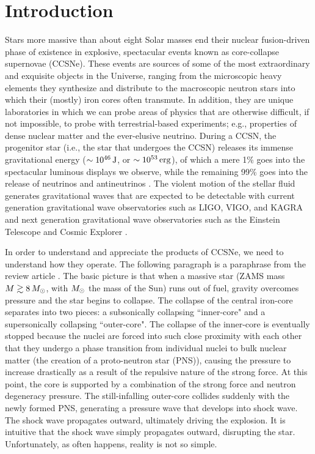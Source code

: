 \chapter{Introduction}

Stars more massive than about eight Solar masses end their nuclear
fusion-driven phase of existence in explosive, spectacular events
known as core-collapse supernovae (CCSNe).
These events are sources of some of the most extraordinary and
exquisite objects in the Universe, ranging from the microscopic heavy elements
they synthesize and distribute
to the macroscopic neutron stars into which their
(mostly) iron cores often transmute.
In addition, they are unique laboratories in which we can probe areas of
physics that are otherwise difficult, if not impossible, to probe with
terrestrial-based experiments; e.g., properties of dense nuclear matter and the
ever-elusive neutrino.
During a CCSN, the progenitor star (i.e., the star that undergoes the CCSN)
releases its immense gravitational energy
($\sim10^{46}\,\mathrm{J}$, or $\sim10^{53}\,\mathrm{erg}$), of which a mere 1\% goes into
the spectacular luminous displays we observe, while the remaining 99\% goes
into the release of neutrinos and antineutrinos \citep{bw2017}.
The violent motion of the stellar fluid generates gravitational waves that
are expected to be detectable with current generation gravitational wave
observatories such as LIGO, VIGO, and KAGRA \citep{aaa2020a,aaa2020b}
and next generation gravitational wave observatories such as
the Einstein Telescope \citep{mvb2020} and Cosmic Explorer \citep{eaa2021}.

In order to understand and appreciate the products of CCSNe, we need to
understand how they operate.
The following paragraph is a paraphrase from the review article \citet{m2005}.
The basic picture is that when a massive star
(ZAMS mass $M\gtrsim8\,M_{\odot}$, with $M_{\odot}$ the mass of the Sun)
runs out of fuel, gravity overcomes pressure
and the star begins to collapse.
The collapse of the central iron-core separates into two pieces: a subsonically
collapsing ``inner-core" and a supersonically collapsing ``outer-core".
The collapse of the inner-core is eventually stopped because the nuclei are
forced into such close proximity with each other that they undergo a
phase transition from individual nuclei to bulk nuclear matter
(the creation of a proto-neutron star (PNS)),
causing the pressure to increase drastically as a result of the repulsive
nature of the strong force.
At this point, the core is supported by a combination of the strong force and
neutron degeneracy pressure.
The still-infalling outer-core collides suddenly with the newly formed PNS,
generating a pressure wave that develops into shock wave.
The shock wave propagates outward, ultimately driving the explosion.
It is intuitive that the shock wave simply propagates outward, disrupting
the star.
Unfortunately, as often happens, reality is not so simple.

